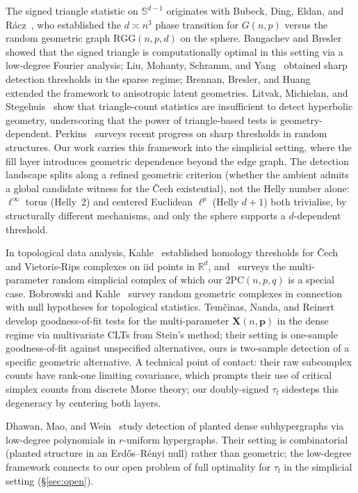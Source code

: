 \documentclass[reqno,12pt]{amsart}
\newcommand{\tauf}{\tau_{\mathrm{f}}}
\newcommand{\PC}{\mathrm{2PC}}
\newcommand{\RGG}{\mathrm{RGG}}
\newcommand{\RR}{\mathbb{R}}
\newcommand{\Sph}{\mathbb{S}}
\theoremstyle{plain}
\theoremstyle{definition}
\theoremstyle{remark}
\begin{document}
The signed triangle statistic on $\Sph^{d-1}$ originates with Bubeck, Ding, Eldan, and
R\'acz~\cite{Bubeck2016}, who established the $d \asymp n^3$ phase transition for $G(n,p)$
versus the random geometric graph $\RGG(n,p,d)$ on the sphere. Bangachev and
Bresler~\cite{BangachevBresler2024} showed that the signed triangle is computationally
optimal in this setting via a low-degree Fourier analysis; Liu, Mohanty, Schramm, and
Yang~\cite{Liu2022} obtained sharp detection thresholds in the sparse regime; Brennan,
Bresler, and Huang~\cite{Brennan2022} extended the framework to anisotropic latent
geometries. Litvak, Michielan, and Stegehuis~\cite{Litvak2022} show that triangle-count
statistics are insufficient to detect hyperbolic geometry, underscoring that the power
of triangle-based tests is geometry-dependent. Perkins~\cite{Perkins2024} surveys recent
progress on sharp thresholds in random structures. Our work carries this framework into
the simplicial setting, where the fill layer introduces geometric dependence beyond the
edge graph. The detection landscape splits along a refined geometric criterion (whether
the ambient admits a global candidate witness for the \v{C}ech existential), not the
Helly number alone: $\ell^\infty$ torus (Helly~2) and centered Euclidean $\ell^p$ (Helly
$d{+}1$) both trivialise, by structurally different mechanisms, and only the sphere
supports a $d$-dependent threshold.

In topological data analysis, Kahle~\cite{Kahle2011} established homology thresholds for
\v{C}ech and Vietoris-Rips complexes on iid points in $\RR^d$, and~\cite{Kahle2016}
surveys the multi-parameter random simplicial complex of which our $\PC(n, p, q)$ is a
special case. Bobrowski and Kahle~\cite{Bobrowski2018} survey random geometric complexes
in connection with null hypotheses for topological statistics. Tem\v{c}inas, Nanda, and
Reinert~\cite{Temcinas2025} develop goodness-of-fit tests for the multi-parameter
$\mathbf{X}(n, \mathbf{p})$ in the dense regime via multivariate CLTs from Stein's
method; their setting is one-sample goodness-of-fit against unspecified alternatives,
ours is two-sample detection of a specific geometric alternative. A technical point of
contact: their raw subcomplex counts have rank-one limiting covariance, which prompts
their use of critical simplex counts from discrete Morse theory; our doubly-signed
$\tauf$ sidesteps this degeneracy by centering both layers.

Dhawan, Mao, and Wein~\cite{DhawanMaoWein2023} study detection of planted dense
subhypergraphs via low-degree polynomials in $r$-uniform hypergraphs. Their setting is
combinatorial (planted structure in an Erd\H{o}s--R\'enyi null) rather than geometric;
the low-degree framework connects to our open problem of full optimality for $\tauf$ in
the simplicial setting (\S\ref{sec:open}).
\end{document}
